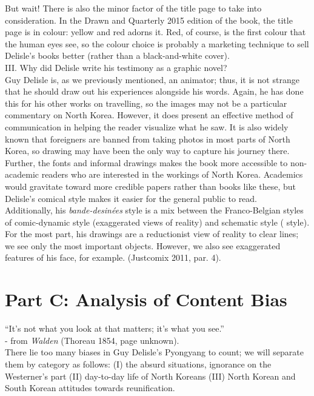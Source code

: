 \documentclass{article}
\begin{document}
\qquad But wait! There is also the minor factor of the title page to take into consideration. In the Drawn and Quarterly 2015 edition of the book, the title page is in colour: yellow and red adorns it. Red, of course, is the first colour that the human eyes see, so the colour choice is probably a marketing technique to sell Delisle’s books better (rather than a black-and-white cover). \\

III. Why did Delisle write his testimony as a graphic novel? \\

\qquad Guy Delisle is, as we previously mentioned, an animator; thus, it is not strange that he should draw out his experiences alongside his words. Again, he has done this for his other works on travelling, so the images may not be a particular commentary on North Korea. However, it does present an effective method of communication in helping the reader visualize what he saw. It is also widely known that foreigners are banned from taking photos in most parts of North Korea, so drawing may have been the only way to capture his journey there. \\

\qquad Further, the fonts and informal drawings makes the book more accessible to non-academic readers who are interested in the workings of North Korea. Academics would gravitate toward more credible papers rather than books like these, but Delisle’s comical style makes it easier for the general public to read.\\

\qquad Additionally, his \textit{bande-desinées} style is a mix between the Franco-Belgian styles of comic-dynamic style (exaggerated views of reality) and schematic style ( style). For the most part, his drawings are a reductionist view of reality to clear lines; we see only the most important objects. However, we also see exaggerated features of his face, for example. (Justcomix 2011, par. 4).

\section{Part C: Analysis of Content Bias}

“It’s not what you look at that matters; it’s what you see.” \\ 
- from \textit{Walden}  (Thoreau 1854, page unknown). \\

There lie too many biases in Guy Delisle’s Pyongyang to count; we will separate them by category as follows: (I) the absurd situations, ignorance on the Westerner’s part (II) day-to-day life of North Koreans (III) North Korean and South Korean attitudes towards reunification. \\
\end{document}
